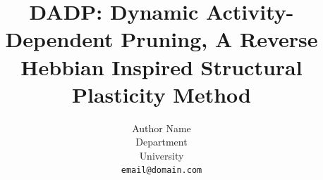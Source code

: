 \documentclass{article} %
\title{DADP: Dynamic Activity-Dependent Pruning, A Reverse Hebbian Inspired Structural Plasticity Method}
\author{Author Name \\
Department \\
University \\
\texttt{email@domain.com}
}
\begin{document}
\maketitle

\begin{abstract}

\end{abstract}




















\clearpage
\appendix

\end{document}
